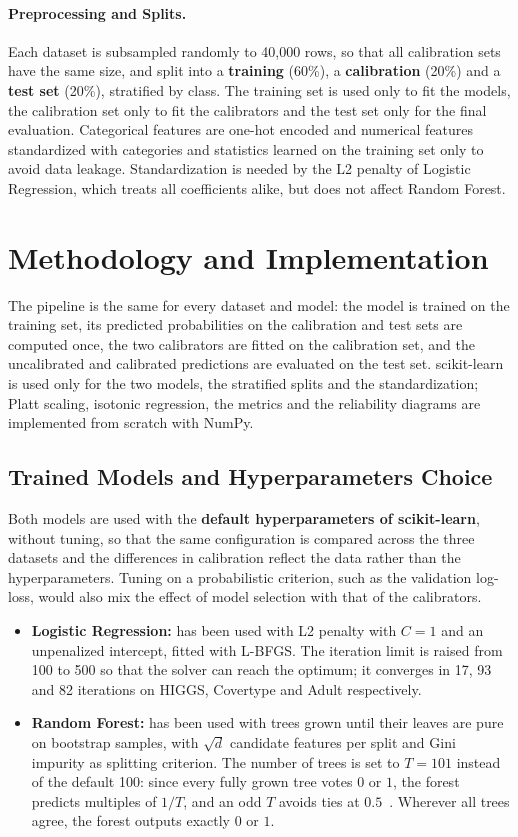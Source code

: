 \documentclass[a4paper, 10pt]{article}
\begin{document}
\paragraph{Preprocessing and Splits.} 
Each dataset is subsampled randomly to 40,000 rows, so that all calibration sets have the same size, and split into a \textbf{training} (60\%), a \textbf{calibration} (20\%) and a \textbf{test set} (20\%), stratified by class. The training set is used only to fit the models, the calibration set only to fit the calibrators and the test set only for the final evaluation. Categorical features are one-hot encoded and numerical features standardized with categories and statistics learned on the training set only to avoid data leakage. Standardization is needed by the L2 penalty of Logistic Regression, which treats all coefficients alike, but does not affect Random Forest. 

\section{Methodology and Implementation}\label{sec:method}
The pipeline is the same for every dataset and model: the model is trained on the training set, its predicted probabilities on the calibration and test sets are computed once, the two calibrators are fitted on the calibration set, and the uncalibrated and calibrated predictions are evaluated on the test set. scikit-learn~\cite{pedregosa2011scikit} is used only for the two models, the stratified splits and the standardization; Platt scaling, isotonic regression, the metrics and the reliability diagrams are implemented from scratch with NumPy.


\subsection{Trained Models and Hyperparameters Choice}\label{sec:models}
Both models are used with the \textbf{default hyperparameters of scikit-learn}, without tuning, so that the same configuration is compared across the three datasets and the differences in calibration reflect the data rather than the hyperparameters. Tuning on a probabilistic criterion, such as the validation log-loss, would also mix the effect of model selection with that of the calibrators.
\begin{itemize}
  \item \textbf{Logistic Regression:} has been used with L2 penalty with $C=1$ and an unpenalized intercept, fitted with L-BFGS. The iteration limit is raised from 100 to 500 so that the solver can reach the optimum; it converges in 17, 93 and 82 iterations on HIGGS, Covertype and Adult respectively.
  \item \textbf{Random Forest:} has been used with trees grown until their leaves are pure on bootstrap samples, with $\sqrt{d}$ candidate features per split and Gini impurity as splitting criterion. The number of trees is set to $T=101$ instead of the default 100: since every fully grown tree votes $0$ or $1$, the forest predicts multiples of $1/T$, and an odd $T$ avoids ties at $0.5$~\cite{cesabianchi2026notes}. Wherever all trees agree, the forest outputs exactly $0$ or $1$.
\end{itemize}
\end{document}
